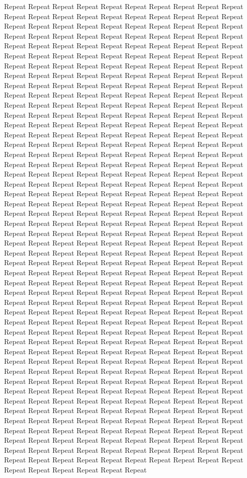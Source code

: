 \documentclass[journal]{IEEEtran}
\begin{document}
Repeat Repeat Repeat Repeat Repeat Repeat Repeat Repeat Repeat Repeat Repeat Repeat Repeat Repeat Repeat Repeat Repeat Repeat Repeat Repeat Repeat Repeat Repeat Repeat Repeat Repeat Repeat Repeat Repeat Repeat Repeat Repeat Repeat Repeat Repeat Repeat Repeat Repeat Repeat Repeat Repeat Repeat Repeat Repeat Repeat Repeat Repeat Repeat Repeat Repeat Repeat Repeat Repeat Repeat Repeat Repeat Repeat Repeat Repeat Repeat Repeat Repeat Repeat Repeat Repeat Repeat Repeat Repeat Repeat Repeat Repeat Repeat Repeat Repeat Repeat Repeat Repeat Repeat Repeat Repeat Repeat Repeat Repeat Repeat Repeat Repeat Repeat Repeat Repeat Repeat Repeat Repeat Repeat Repeat Repeat Repeat Repeat Repeat Repeat Repeat Repeat Repeat Repeat Repeat Repeat Repeat Repeat Repeat Repeat Repeat Repeat Repeat Repeat Repeat Repeat Repeat Repeat Repeat Repeat Repeat Repeat Repeat Repeat Repeat Repeat Repeat Repeat Repeat Repeat Repeat Repeat Repeat Repeat Repeat Repeat Repeat Repeat Repeat Repeat Repeat Repeat Repeat Repeat Repeat Repeat Repeat Repeat Repeat Repeat Repeat Repeat Repeat Repeat Repeat Repeat Repeat Repeat Repeat Repeat Repeat Repeat Repeat Repeat Repeat Repeat Repeat Repeat Repeat Repeat Repeat Repeat Repeat Repeat Repeat Repeat Repeat Repeat Repeat Repeat Repeat Repeat Repeat Repeat Repeat Repeat Repeat Repeat Repeat Repeat Repeat Repeat Repeat Repeat Repeat Repeat Repeat Repeat Repeat Repeat Repeat Repeat Repeat Repeat Repeat Repeat Repeat Repeat Repeat Repeat Repeat Repeat Repeat Repeat Repeat Repeat Repeat Repeat Repeat Repeat Repeat Repeat Repeat Repeat Repeat Repeat Repeat Repeat Repeat Repeat Repeat Repeat Repeat Repeat Repeat Repeat Repeat Repeat Repeat Repeat Repeat Repeat Repeat Repeat Repeat Repeat Repeat Repeat Repeat Repeat Repeat Repeat Repeat Repeat Repeat Repeat Repeat Repeat Repeat Repeat Repeat Repeat Repeat Repeat Repeat Repeat Repeat Repeat Repeat Repeat Repeat Repeat Repeat Repeat Repeat Repeat Repeat Repeat Repeat Repeat Repeat Repeat Repeat Repeat Repeat Repeat Repeat Repeat Repeat Repeat Repeat Repeat Repeat Repeat Repeat Repeat Repeat Repeat Repeat Repeat Repeat Repeat Repeat Repeat Repeat Repeat Repeat Repeat Repeat Repeat Repeat Repeat Repeat Repeat Repeat Repeat Repeat Repeat Repeat Repeat Repeat Repeat Repeat Repeat Repeat Repeat Repeat Repeat Repeat Repeat Repeat Repeat Repeat Repeat Repeat Repeat Repeat Repeat Repeat Repeat Repeat Repeat Repeat Repeat Repeat Repeat Repeat Repeat Repeat Repeat Repeat Repeat Repeat Repeat Repeat Repeat Repeat Repeat Repeat Repeat Repeat Repeat Repeat Repeat Repeat Repeat Repeat Repeat Repeat Repeat Repeat Repeat Repeat Repeat Repeat Repeat Repeat Repeat Repeat Repeat Repeat Repeat Repeat Repeat Repeat Repeat Repeat Repeat Repeat Repeat Repeat Repeat Repeat Repeat Repeat Repeat Repeat Repeat Repeat Repeat Repeat Repeat Repeat Repeat Repeat Repeat Repeat Repeat Repeat Repeat Repeat Repeat Repeat Repeat Repeat Repeat Repeat Repeat Repeat Repeat Repeat Repeat Repeat Repeat Repeat Repeat Repeat Repeat Repeat Repeat Repeat Repeat Repeat Repeat Repeat Repeat Repeat Repeat Repeat Repeat Repeat Repeat Repeat Repeat Repeat Repeat Repeat Repeat Repeat Repeat Repeat Repeat Repeat Repeat Repeat Repeat Repeat Repeat Repeat Repeat Repeat Repeat Repeat Repeat Repeat Repeat Repeat Repeat Repeat Repeat Repeat Repeat Repeat Repeat Repeat Repeat Repeat 
\end{document}
